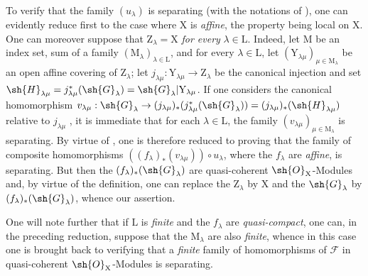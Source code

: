 \begin{env}[11.9.3]
\label{IV.11.9.3}
To verify that the family $(u_\lambda)$ is separating (with the notations of ), one can evidently reduce first to the case where $\mathrm{X}$ is \emph{affine}, the property being local on $\mathrm{X}$.
One can moreover suppose that $\mathrm{Z}_\lambda=\mathrm{X}$ \emph{for every} $\lambda\in\mathrm{L}$.
Indeed, let $\mathrm{M}$ be an index set, sum of a family $(\mathrm{M}_\lambda)_{\lambda\in\mathrm{L}}$, and for every $\lambda\in\mathrm{L}$, let $(\mathrm{Y}_{\lambda\mu})_{\mu\in\mathrm{M}_\lambda}$ be an open affine covering of $\mathrm{Z}_\lambda$; let $j_{\lambda\mu}:\mathrm{Y}_{\lambda\mu}\to\mathrm{Z}_\lambda$ be the canonical injection and set $\sh{H}_{\lambda\mu}=j_{\lambda\mu}^*(\sh{G}_\lambda)=\sh{G}_\lambda|\mathrm{Y}_{\lambda\mu}$.
If one considers the canonical homomorphism $v_{\lambda\mu}:\sh{G}_\lambda\to(j_{\lambda\mu})_*(j_{\lambda\mu}^*(\sh{G}_\lambda))=(j_{\lambda\mu})_*(\sh{H}_{\lambda\mu})$ relative to $j_{\lambda\mu}$ , it is immediate that for each $\lambda\in\mathrm{L}$, the family $(v_{\lambda\mu})_{\mu\in\mathrm{M}_\lambda}$ is separating.
By virtue of , one is therefore reduced to proving that the family of composite homomorphisms $((f_\lambda)_*(v_{\lambda\mu}))\circ u_\lambda$, where the $f_\lambda$ are \emph{affine}, is separating.
But then the $(f_\lambda)_*(\sh{G}_\lambda)$ are quasi-coherent $\sh{O}_\mathrm{X}$-Modules  and, by virtue of the definition, one can replace the $\mathrm{Z}_\lambda$ by $\mathrm{X}$ and the $\sh{G}_\lambda$ by $(f_\lambda)_*(\sh{G}_\lambda)$, whence our assertion.

One will note further that if $\mathrm{L}$ is \emph{finite} and the $f_\lambda$ are \emph{quasi-compact}, one can, in the preceding reduction, suppose that the $\mathrm{M}_\lambda$ are also \emph{finite}, whence in this case one is brought back to verifying that a \emph{finite} family of homomorphisms of $\mathscr{F}$ in quasi-coherent $\sh{O}_\mathrm{X}$-Modules is separating.
\end{env}

